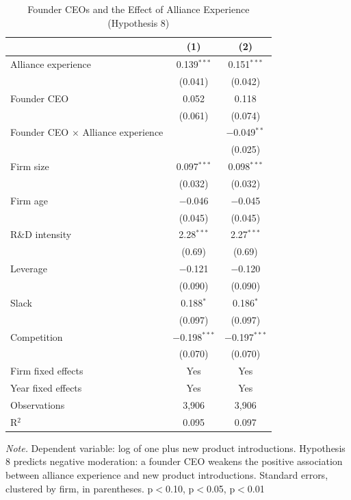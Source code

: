 \documentclass[12pt]{article}
\begin{document}
\begin{table}[p]
\centering\small
\caption{Founder CEOs and the Effect of Alliance Experience (Hypothesis 8)}
\begin{tabular}{lcc}
\toprule
 & (1) & (2) \\
\midrule
Alliance experience & 0.139$^{***}$ & 0.151$^{***}$ \\
 & (0.041) & (0.042) \\[2pt]
Founder CEO & 0.052 & 0.118 \\
 & (0.061) & (0.074) \\[2pt]
Founder CEO $\times$ Alliance experience &  & $-$0.049$^{**}$ \\
 &  & (0.025) \\[2pt]
Firm size & 0.097$^{***}$ & 0.098$^{***}$ \\
 & (0.032) & (0.032) \\[2pt]
Firm age & $-$0.046 & $-$0.045 \\
 & (0.045) & (0.045) \\[2pt]
R\&D intensity & 2.28$^{***}$ & 2.27$^{***}$ \\
 & (0.69) & (0.69) \\[2pt]
Leverage & $-$0.121 & $-$0.120 \\
 & (0.090) & (0.090) \\[2pt]
Slack & 0.188$^{*}$ & 0.186$^{*}$ \\
 & (0.097) & (0.097) \\[2pt]
Competition & $-$0.198$^{***}$ & $-$0.197$^{***}$ \\
 & (0.070) & (0.070) \\[2pt]
\midrule
Firm fixed effects & Yes & Yes \\
Year fixed effects & Yes & Yes \\
Observations & 3,906 & 3,906 \\
R$^2$ & 0.095 & 0.097 \\
\bottomrule
\end{tabular}
\begin{minipage}{0.92\textwidth}\footnotesize\smallskip
\textit{Note.} Dependent variable: log of one plus new product introductions. Hypothesis 8 predicts negative moderation: a founder CEO weakens the positive association between alliance experience and new product introductions. Standard errors, clustered by firm, in parentheses. \textasteriskcentered{} p$<$0.10, \textasteriskcentered{}\textasteriskcentered{} p$<$0.05, \textasteriskcentered{}\textasteriskcentered{}\textasteriskcentered{} p$<$0.01
\end{minipage}
\end{table}
\clearpage
\end{document}
